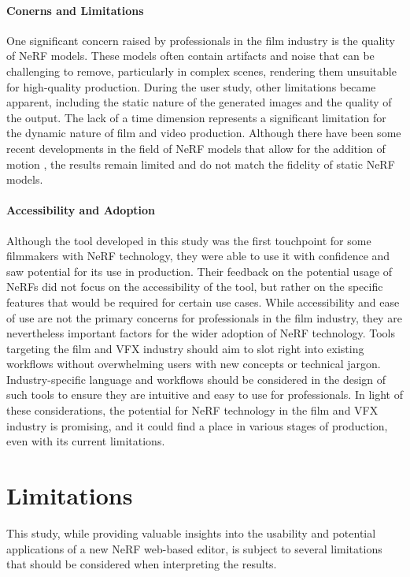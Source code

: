 \paragraph{Conerns and Limitations}
One significant concern raised by professionals in the film industry is the quality of NeRF models.
These models often contain artifacts and noise that can be challenging to remove, particularly in complex scenes, rendering them unsuitable for high-quality production.
During the user study, other limitations became apparent, including the static nature of the generated images and the quality of the output.
The lack of a time dimension represents a significant limitation for the dynamic nature of film and video production.
Although there have been some recent developments in the field of NeRF models that allow for the addition of motion  \cite{fridovich-keil_k-planes_2023}, the results remain limited and do not match the fidelity of static NeRF models.

\paragraph{Accessibility and Adoption}
Although the tool developed in this study was the first touchpoint for some filmmakers with NeRF technology, they were able to use it with confidence and saw potential for its use in production.
Their feedback on the potential usage of NeRFs did not focus on the accessibility of the tool, but rather on the specific features that would be required for certain use cases.
While accessibility and ease of use are not the primary concerns for professionals in the film industry, they are nevertheless important factors for the wider adoption of NeRF technology.
Tools targeting the film and VFX industry should aim to slot right into existing workflows without overwhelming users with new concepts or technical jargon.
Industry-specific language and workflows should be considered in the design of such tools to ensure they are intuitive and easy to use for professionals.
In light of these considerations, the potential for NeRF technology in the film and VFX industry is promising, and it could find a place in various stages of production, even with its current limitations.

\section{Limitations}
\label{sec:discussion:limitations}

This study, while providing valuable insights into the usability and potential applications of a new NeRF web-based editor, is subject to several limitations that should be considered when interpreting the results.

